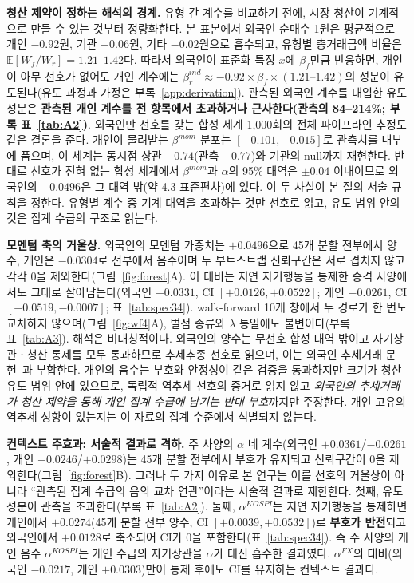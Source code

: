 \textbf{청산 제약이 정하는 해석의 경계.} 유형 간 계수를 비교하기 전에, 시장 청산이
기계적으로 만들 수 있는 것부터 정량화한다. 본 표본에서 외국인 순매수 1원은 평균적으로
개인 $-0.92$원, 기관 $-0.06$원, 기타 $-0.02$원으로 흡수되고, 유형별 총거래금액
비율은 $\mathbb{E}[W_{f}/W_{r}]=1.21\text{--}1.42$다. 따라서 외국인이 표준화 특징
$x$에 $\beta_f$만큼 반응하면, 개인이 아무 선호가 없어도 개인 계수에는
$\beta_{r}^{ind}\approx-0.92\times\beta_f\times(1.21\text{--}1.42)$의 성분이
유도된다(유도 과정과 가정은 부록~\ref{app:derivation}). 관측된 외국인 계수를 대입한
유도 성분은 \textbf{관측된 개인 계수를 전 항목에서 초과하거나 근사한다(관측의
84--214\%; 부록 표~\ref{tab:A2})}. 외국인만 선호를 갖는 합성 세계 1{,}000회의 전체
파이프라인 추정도 같은 결론을 준다. 개인이 물려받는 $\beta^{mom}$ 분포는
$[-0.101,-0.015]$로 관측치를 내부에 품으며, 이 세계는 동시점 상관 $-0.74$(관측
$-0.77$)와 기관의 null까지 재현한다. 반대로 선호가 전혀 없는 합성 세계에서
$\beta^{mom}$과 $\alpha$의 95\% 대역은 $\pm0.04$ 이내이므로 외국인의 $+0.0496$은 그
대역 밖(약 4.3 표준편차)에 있다. 이 두 사실이 본 절의 서술 규칙을 정한다. 유형별
계수 중 기계 대역을 초과하는 것만 선호로 읽고, 유도 범위 안의 것은 집계 수급의
구조로 읽는다.

\textbf{모멘텀 축의 거울상.} 외국인의 모멘텀 가중치는 $+0.0496$으로 45개 분할
전부에서 양수, 개인은 $-0.0304$로 전부에서 음수이며 두 부트스트랩 신뢰구간은 서로
겹치지 않고 각각 0을 제외한다(그림~\ref{fig:forest}A). 이 대비는 지연 자기행동을
통제한 승격 사양에서도 그대로 살아남는다(외국인 $+0.0331$, CI $[+0.0126,+0.0522]$;
개인 $-0.0261$, CI $[-0.0519,-0.0007]$; 표~\ref{tab:spec34}). walk-forward 10개
창에서 두 경로가 한 번도 교차하지 않으며(그림~\ref{fig:wf4}A), 벌점 종류와
$\lambda$ 통일에도 불변이다(부록 표~\ref{tab:A3}). 해석은 비대칭적이다. 외국인의
양수는 무선호 합성 대역 밖이고 자기상관ㆍ청산 통제를 모두 통과하므로 추세추종
선호로 읽으며, 이는 외국인 추세거래
문헌~\cite{grinblatt2000investment,choe1999foreign}과 부합한다. 개인의 음수는
부호와 안정성이 같은 검증을 통과하지만 크기가 청산 유도 범위 안에 있으므로,
독립적 역추세 선호의 증거로 읽지 않고 \emph{외국인의 추세거래가 청산 제약을 통해
개인 집계 수급에 남기는 반대 부호}까지만 주장한다. 개인 고유의 역추세 성향이 있는지는
이 자료의 집계 수준에서 식별되지 않는다.

\textbf{컨텍스트 주효과: 서술적 결과로 격하.} 주 사양의 $\alpha$ 네 계수(외국인
$+0.0361$/$-0.0261$, 개인 $-0.0246$/$+0.0298$)는 45개 분할 전부에서 부호가 유지되고
신뢰구간이 0을 제외한다(그림~\ref{fig:forest}B). 그러나 두 가지 이유로 본 연구는
이를 선호의 거울상이 아니라 ``관측된 집계 수급의 음의 교차 연관''이라는 서술적
결과로 제한한다. 첫째, 유도 성분이 관측을 초과한다(부록 표~\ref{tab:A2}). 둘째,
$\alpha^{KOSPI}$는 지연 자기행동을 통제하면 개인에서 $+0.0274$(45개 분할 전부 양수,
CI $[+0.0039,+0.0532]$)로 \textbf{부호가 반전}되고 외국인에서 $+0.0128$로 축소되어
CI가 0을 포함한다(표~\ref{tab:spec34}). 즉 주 사양의 개인 음수 $\alpha^{KOSPI}$는
개인 수급의 자기상관을 $\alpha$가 대신 흡수한 결과였다. $\alpha^{FX}$의 대비(외국인
$-0.0217$, 개인 $+0.0303$)만이 통제 후에도 CI를 유지하는 컨텍스트 결과다.

